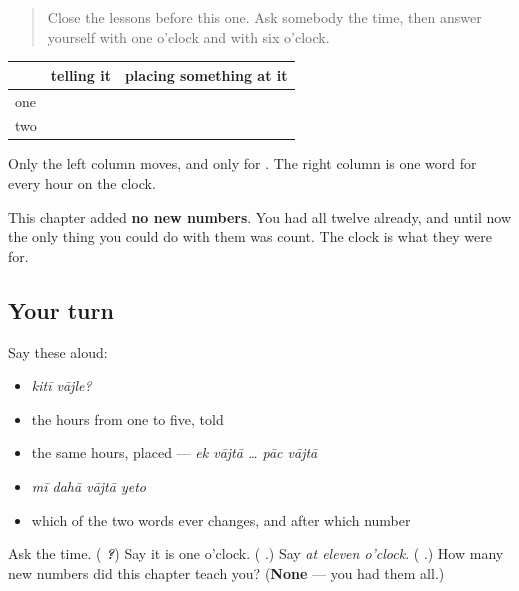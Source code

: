 \label{lesson:MR-R67-clock-recall}



\begin{quote}
Close the lessons before this one. Ask somebody the time, then answer yourself with one o'clock and with six o'clock.
\end{quote}

\begin{grammarlens}[title={Grammar Lens: two words, one of which counts}]
\noindent
\begin{tabularx}{\linewidth}{@{}>{\raggedright\arraybackslash}X>{\raggedright\arraybackslash}X>{\raggedright\arraybackslash}X@{}}
\toprule
\textbf{} & \textbf{telling it} & \textbf{placing something at it} \\
\midrule
one & \textbf{\mr{एक} \mr{वाजला}} & \textbf{\mr{एक} \mr{वाजता}} \\
two & \textbf{\mr{दोन} \mr{वाजले}} & \textbf{\mr{दोन} \mr{वाजता}} \\
\bottomrule
\end{tabularx}

Only the left column moves, and only for \textbf{}. The right column is one word for every hour on the clock.

This chapter added \textbf{no new numbers}. You had all twelve already, and until now the only thing you could do with them was count. The clock is what they were for.
\end{grammarlens}

\subsection*{Your turn}
Say these aloud:

\begin{itemize}
\raggedright
  \item \emph{kitī vājle?}
  \item the hours from one to five, told
  \item the same hours, placed — \emph{ek vājtā … pāc vājtā}
  \item \emph{mī dahā vājtā yeto}
  \item which of the two words ever changes, and after which number
\end{itemize}

\begin{tcolorbox}[breakable,colback=teal!4,colframe=teal!35!black,title={Before you move on}]
Ask the time. (\emph{\textbf{ ?}}) Say it is one o'clock. (\emph{\textbf{ }}.) Say \emph{at eleven o'clock}. (\emph{\textbf{ }}.) How many new numbers did this chapter teach you? (\textbf{None} — you had them all.)
\end{tcolorbox}
